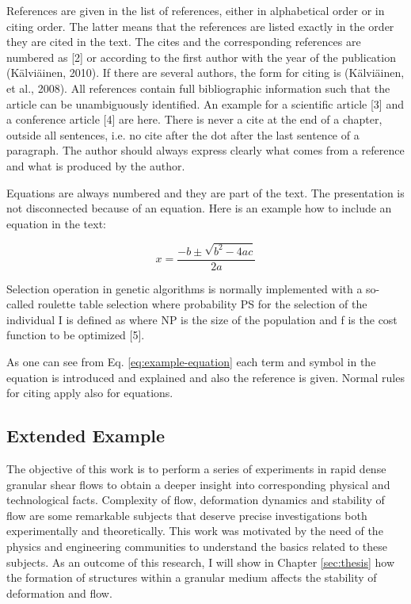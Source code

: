 \par References are given in the list of references, either in alphabetical order or in citing order. The latter means that the references are listed exactly in the order they are cited in the text. The cites and the corresponding references are numbered as [2] or according to the first author with the year of the publication (K\"{a}lvi\"{a}inen, 2010). If there are several authors, the form for citing is (K\"{a}lvi\"{a}inen, et al., 2008).  All references contain full bibliographic information such that the article can be unambiguously identified. An example for a scientific article [3] and a conference article [4] are here. There is never a cite at the end of a chapter, outside all sentences, i.e. no cite after the dot after the last sentence of a paragraph. The author should always express clearly what comes from a reference and what is produced by the author. 

\par Equations are always numbered and they are part of the text. The presentation is not disconnected because of an equation. Here is an example how to include an equation in the text:

\begin{equation}
   \label{eq:example-equation}
   x=\frac{-b\pm\sqrt{b^2-4ac}}{2a}
\end{equation}

\par Selection operation in genetic algorithms is normally implemented with a so-called roulette table selection where probability PS for the selection of the individual I  is defined as where NP is the size of the population and f is the cost function to be optimized [5].

\par As one can see from Eq. \ref{eq:example-equation} each term and symbol in the equation is introduced and explained and also the reference is given. Normal rules for citing apply also for equations. 

\subsection[EXTENDED EXAMPLE]{Extended Example}
\par The objective of this work is to perform a series of experiments
in rapid dense granular shear flows  to obtain a deeper insight
into corresponding physical and technological facts. Complexity of
flow, deformation dynamics and stability of flow are some
remarkable subjects that deserve precise investigations both
experimentally and theoretically. This work was motivated by the
need of the physics and engineering communities to understand the
basics related to these subjects. As an outcome of this research,
I will show in Chapter \ref{sec:thesis} how the formation of
structures within a granular medium affects the stability of
deformation and flow.

